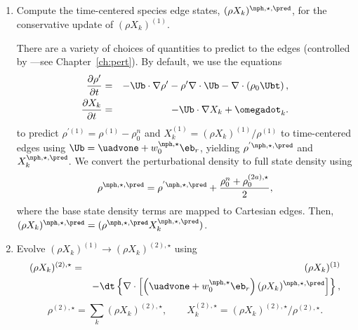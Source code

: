 \begin{description}
\begin{enumerate}
\begin{enumerate}
\renewcommand{\labelenumii}{{\bf \roman{enumii}}.}

\item Compute the time-centered species edge states, $(\rho X_k)^{\nph,\star,\pred}$,
  for the conservative update of $(\rho X_k)^{(1)}$.  

  There are a variety of choices of quantities to predict to the
  edges (controlled by ---see Chapter~\ref{ch:pert}).
  By default, we use the equations 
\begin{eqnarray}
\frac{\partial\rho'}{\partial t} &=& -\Ub\cdot\nabla\rho' - 
     \rho'\nabla\cdot\Ub - \nabla\cdot\left(\rho_0\Ubt\right),
     \label{eq:Perturbational Density}  \\
\frac{\partial X_k}{\partial t} &=& -\Ub\cdot\nabla X_k + 
     \omegadot_k. \label{eq:Primitive Species}
\end{eqnarray}
  to
  predict $\rho^{'(1)} = \rho^{(1)} - \rho_0^n$ and 
  $X_k^{(1)} = (\rho  X_k)^{(1)} / \rho^{(1)}$ to time-centered edges using 
  $\Ub = \uadvone+w_0^{\nph,\star}\eb_r$, yielding $\rho^{'\nph,\star,\pred}$ 
  and $X_k^{\nph,\star,\pred}$.
  We convert the perturbational density to full state density using
\begin{equation}
\rho^{\nph,\star,\pred} = \rho^{'\nph,\star,\pred} + \frac{\rho_0^n + \rho_0^{(2a),\star}}{2},
\end{equation}
  where the base state density terms are mapped to Cartesian edges.
  Then,\\
  $(\rho X_k)^{\nph,\star,\pred} = (\rho^{\nph,\star,\pred}X_k^{\nph,\star,\pred})$.

\item Evolve $(\rho X_k)^{(1)} \rightarrow (\rho X_k)^{(2),\star}$ using
\begin{eqnarray}
(\rho X_k)^{(2),\star} &=& (\rho X_k)^{(1)} \nonumber \\
&& - \dt \left\{ \nabla \cdot \left[ \left(\uadvone+w_0^{\nph,\star} \eb_r\right) (\rho X_k)^{\nph,\star,\pred} \right] \right\},\nonumber \\
\end{eqnarray}
\begin{equation}
\rho^{(2),\star} = \sum_k (\rho X_k)^{(2),\star},
\qquad
X_k^{(2),\star} = (\rho X_k)^{(2),\star} / \rho^{(2),\star}.
\end{equation}

\end{enumerate}


\end{enumerate}
\end{description}
